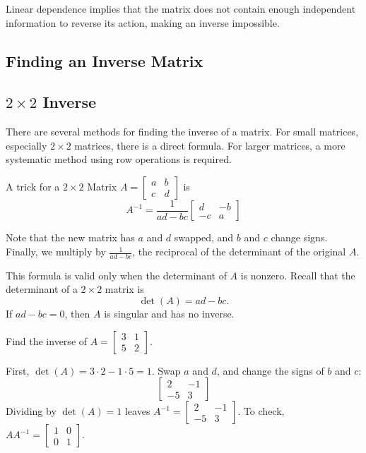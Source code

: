 Linear dependence implies that the matrix does not contain enough independent information to reverse its action, making an inverse impossible.

\subsection{Finding an Inverse Matrix}
\subsection*{$2 \times 2$ Inverse}
There are several methods for finding the inverse of a matrix. 
For small matrices, especially \(2 \times 2\) matrices, there is a direct formula. 
For larger matrices, a more systematic method using row operations is required.

\begin{mdframed}[frametitle = {Inverse of a $2 \times 2$ Matrix}, style = important]
A trick for a $2 \times 2$ Matrix $A = \begin{bmatrix}
a & b \\
c & d
\end{bmatrix}$ is 
$$A^{-1} = \frac{1}{ad - bc}\begin{bmatrix}
d & -b \\
-c & a
\end{bmatrix}$$

Note that the new matrix has $a$ and $d$ swapped, and $b$ and $c$ change signs. Finally, we multiply by $\frac{1}{ad - bc}$, the reciprocal of the determinant of the original $A$. 
\end{mdframed}

This formula is valid only when the determinant of \(A\) is nonzero. 
Recall that the determinant of a \(2 \times 2\) matrix is
\[
\det(A) = ad - bc.
\]
If \(ad - bc = 0\), then \(A\) is singular and has no inverse.

\begin{Worked}[2 by 2 inverse]
\begin{Problem}
Find the inverse of $A = \begin{bmatrix} 3 & 1 \\ 5 & 2 \end{bmatrix}$.
\end{Problem}
\begin{Solution}
First, $\det(A) = 3 \cdot 2 - 1 \cdot 5 = 1$. Swap $a$ and $d$, and change the signs of $b$ and $c$:
$$\begin{bmatrix} 2 & -1 \\ -5 & 3 \end{bmatrix}$$
Dividing by $\det(A) = 1$ leaves $A^{-1} = \begin{bmatrix} 2 & -1 \\ -5 & 3 \end{bmatrix}$. To check, $AA^{-1} = \begin{bmatrix} 1 & 0 \\ 0 & 1 \end{bmatrix}$.
\end{Solution}
\end{Worked}

